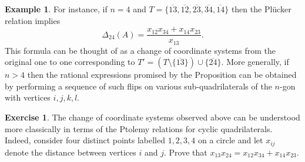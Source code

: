 \documentclass{amsart}
\theoremstyle{definition}
\newtheorem{example}[theorem]{Example}
\newtheorem{exercise}[theorem]{Exercise}
\theoremstyle{remark}
\numberwithin{equation}{section}
\begin{document}
\begin{example}
		For instance, if $n=4$ and $T = \{\overline{13},\overline{12},\overline{23},\overline{34},\overline{14}\}$ then the Pl\"ucker relation implies
		\begin{displaymath}
		\Delta_{24}(A) = \frac{x_{12}x_{34} + x_{14}x_{23}}{x_{13}}.
		\end{displaymath}
		This formula can be thought of as a change of coordinate systems from the original one to one corresponding to $T' = (T \setminus \{\overline{13}\}) \cup \{\overline{24}\}$.  More generally, if $n>4$ then the rational expressions promised by the Proposition can be obtained by performing a sequence of such flips on various sub-quadrilaterals of the $n$-gon with vertices $i,j,k,l$.
    \begin{exercise}
      The change of coordinate systems observed above can be understood more classically in terms of the Ptolemy relations for cyclic quadrilaterals.  Indeed, consider four distinct points labelled $1,2,3,4$ on a circle and let $x_{ij}$ denote the distance between vertices $i$ and $j$.  Prove that $x_{13}x_{24}=x_{12}x_{34}+x_{14}x_{23}$.
    \end{exercise}
  \end{example}
  
\end{document}
